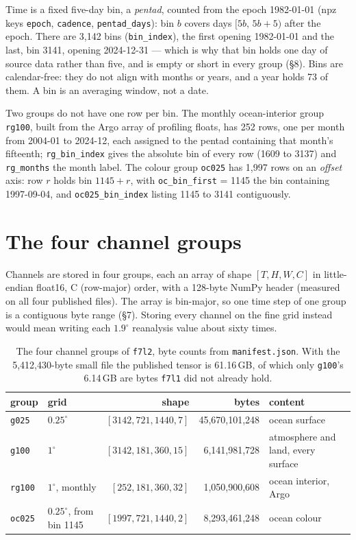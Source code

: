 \documentclass[10pt]{article}
\newcommand{\code}[1]{\texttt{#1}}
\begin{document}
Time is a fixed five-day bin, a \emph{pentad}, counted from the epoch
1982-01-01 (npz keys \code{epoch}, \code{cadence}, \code{pentad\_days}): bin
$b$ covers days $[5b,\,5b+5)$ after the epoch. There are 3,142 bins
(\code{bin\_index}), the first opening 1982-01-01 and the last, bin 3141,
opening 2024-12-31 --- which is why that bin holds one day of source data
rather than five, and is empty or short in every group (\S8). Bins are
calendar-free: they do not align with months or years, and a year holds 73 of
them. A bin is an averaging window, not a date.

Two groups do not have one row per bin. The monthly ocean-interior group
\code{rg100}, built from the Argo array of profiling floats, has 252 rows, one per month from 2004-01 to 2024-12, each assigned to the
pentad containing that month's fifteenth; \code{rg\_bin\_index} gives the
absolute bin of every row (1609 to 3137) and \code{rg\_months} the month
label. The colour group \code{oc025} has 1,997 rows on an \emph{offset} axis:
row $r$ holds bin $1145 + r$, with \code{oc\_bin\_first} = 1145 the bin
containing 1997-09-04, and \code{oc025\_bin\_index} listing 1145 to 3141
contiguously.

\section{The four channel groups}

Channels are stored in four groups, each an array of shape $[T, H, W, C]$ in
little-endian float16, C (row-major) order, with a 128-byte NumPy header
(measured on all four published files). The array is bin-major, so one time
step of one group is a contiguous byte range (\S7). Storing every channel on
the fine grid instead would mean writing each $1.9^\circ$ reanalysis value
about sixty times.

\begin{table}[h]
\centering\small
\begin{tabular}{@{}llrrl@{}}
\toprule
group & grid & shape & bytes & content \\
\midrule
\code{g025} & $0.25^\circ$ & $[3142, 721, 1440, 7]$ & 45,670,101,248 & ocean surface \\
\code{g100} & $1^\circ$ & $[3142, 181, 360, 15]$ & 6,141,981,728 & atmosphere and land, every surface \\
\code{rg100} & $1^\circ$, monthly & $[252, 181, 360, 32]$ & 1,050,900,608 & ocean interior, Argo \\
\code{oc025} & $0.25^\circ$, from bin 1145 & $[1997, 721, 1440, 2]$ & 8,293,461,248 & ocean colour \\
\bottomrule
\end{tabular}
\caption{The four channel groups of \code{f7l2}, byte counts from
\code{manifest.json}. With the 5,412,430-byte small file the published tensor
is 61.16\,GB, of which only \code{g100}'s 6.14\,GB are bytes \code{f7l1} did
not already hold.}
\end{table}
\end{document}

